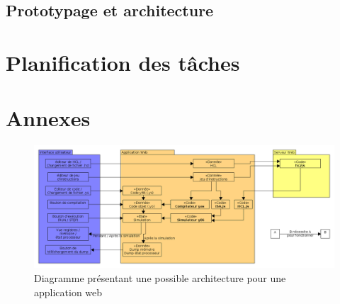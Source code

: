 \documentclass[french]{article}
\begin{document}
\subsection{Prototypage et architecture}

\section{Planification des tâches}

\printbibliography

\newpage
\section{Annexes}

\begin{appendix}

\begin{figure}
    \centering
    \includegraphics[width=\paperwidth, angle=270]{img/architecture_modulaire.png}
    \caption{Diagramme présentant une possible architecture pour une application web}
    \label{fig:diag_archi_modulaire}
\end{figure}

\end{appendix}
\end{document}
